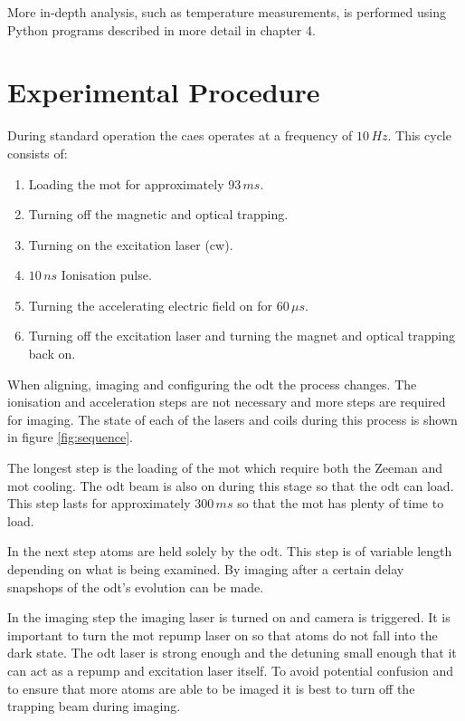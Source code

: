 More in-depth analysis, such as temperature measurements, is performed using Python programs described in more detail in chapter 4.

\section{Experimental Procedure}

During standard operation the \gls{caes} operates at a frequency of $10\,\unit{Hz}$. This cycle consists of:
\begin{enumerate}
\item Loading  the \gls{mot} for approximately $93\,\unit{ms}$.
\item Turning off the magnetic and optical trapping.
\item Turning on the excitation laser (\gls{cw}).
\item $10\,\unit{ns}$ Ionisation pulse.
\item Turning the accelerating electric field on for $60\,\unit{\mu s}$.
\item Turning off the excitation laser and turning the magnet and optical trapping back on.
\end{enumerate}

When aligning, imaging and configuring the \gls{odt} the process changes. The ionisation and acceleration steps are not necessary and more steps are required for imaging. The state of each of the lasers and coils during this process is shown in figure \ref{fig:sequence}.

The longest step is the loading of the \gls{mot} which require both the Zeeman and \gls{mot} cooling. The \gls{odt} beam is also on during this stage so that the \gls{odt} can load. This step lasts for approximately $300\,\unit{ms}$ so that the \gls{mot} has plenty of time to load. 

In the next step atoms are held solely by the \gls{odt}. This step is of variable length depending on what is being examined. By imaging after a certain delay snapshops of the \gls{odt}'s evolution can be made.

In the imaging step the imaging laser is turned on and camera is triggered. It is important to turn the \gls{mot} repump laser on so that atoms do not fall into the dark state. The \gls{odt} laser is strong enough and the detuning small enough that it can act as a repump and excitation laser itself. To avoid potential confusion and to ensure that more atoms are able to be imaged it is best to turn off the trapping beam during imaging.

